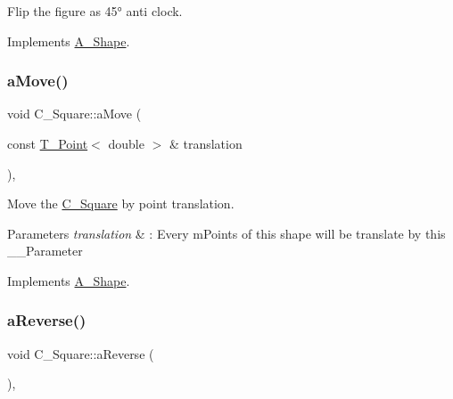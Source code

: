 Flip the figure as 45° anti clock. 



Implements \hyperlink{classA__Shape_abe947e7003cb63be2b4f6c439533427d}{A\+\_\+\+Shape}.

\mbox{\label{classC__Square_a6727523558c58dcd240ec080f254e7c9}} 
\subsubsection{\texorpdfstring{a\+Move()}{aMove()}}
{\footnotesize\ttfamily void C\+\_\+\+Square\+::a\+Move (\begin{DoxyParamCaption}\item[{const \hyperlink{classT__Point}{T\+\_\+\+Point}$<$ double $>$ \&}]{translation }\end{DoxyParamCaption})\hspace{0.3cm}{\ttfamily [override]}, {\ttfamily [virtual]}}



Move the \hyperlink{classC__Square}{C\+\_\+\+Square} by point translation. 


\begin{DoxyParams}{Parameters}
{\em translation} & \+: Every m\+Points of this shape will be translate by this \+\_\+\+\_\+\+Parameter \\
\hline
\end{DoxyParams}


Implements \hyperlink{classA__Shape_ab284298db1b557ccfa7ba6de7a5fee2c}{A\+\_\+\+Shape}.

\mbox{\label{classC__Square_a961d1f5c49a45459668744d459863bd2}} 
\subsubsection{\texorpdfstring{a\+Reverse()}{aReverse()}}
{\footnotesize\ttfamily void C\+\_\+\+Square\+::a\+Reverse (\begin{DoxyParamCaption}{ }\end{DoxyParamCaption})\hspace{0.3cm}{\ttfamily [override]}, {\ttfamily [virtual]}}




